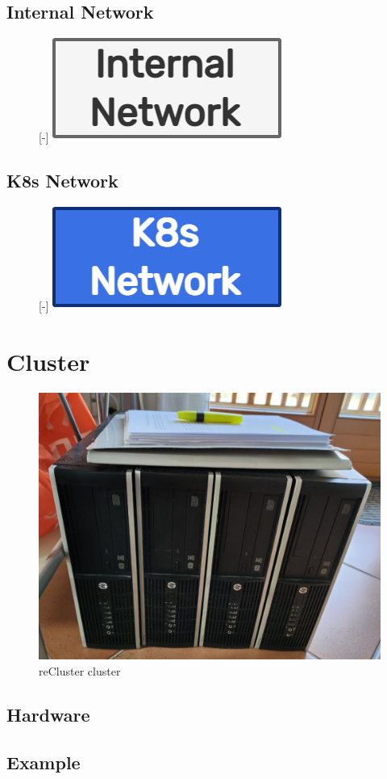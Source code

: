 \subsection{Internal Network}
\label{subsec:architecture_network_internal_network}

\begin{figure} %
  \raisebox{0pt}[\dimexpr\height-\baselineskip\relax]{\centering
  \includegraphics[width=.2\textwidth]{images/recluster/internal_network.png}}
\end{figure}


\subsection{K8s Network}
\label{subsec:architecture_network_k8s_network}

\begin{figure} %
  \raisebox{0pt}[\dimexpr\height-\baselineskip\relax]{\centering
  \includegraphics[width=.2\textwidth]{images/recluster/k8s_network.png}}
\end{figure}


\section{Cluster}
\label{sec:architecture_cluster}

\begin{figure}
  \centering
  \includegraphics[width=.5\textwidth]{images/recluster/cluster.png}
  \caption{reCluster cluster}
\end{figure}

\subsection{Hardware}
\label{subsec:architecture_cluster_hardware}


\subsection{Example}
\label{subsec:architecture_cluster_example}

